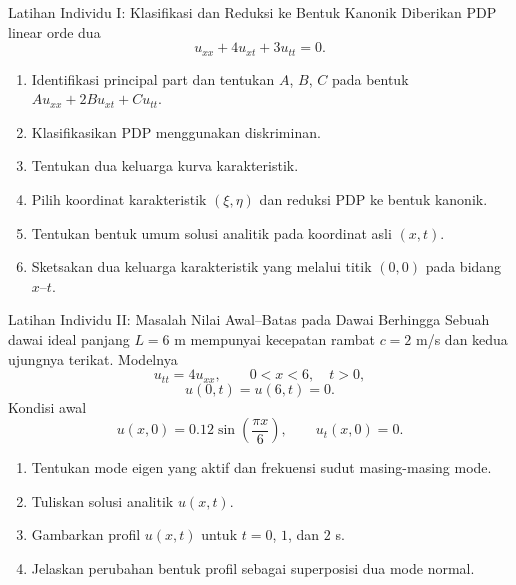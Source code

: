 \documentclass[aspectratio=169,10pt]{beamer}
\begin{document}
\begin{frame}{Latihan Individu I: Klasifikasi dan Reduksi ke Bentuk Kanonik}
\small
Diberikan PDP linear orde dua
\[
\boxed{u_{xx}+4u_{xt}+3u_{tt}=0.}
\]
\begin{enumerate}
  \item Identifikasi principal part dan tentukan $A$, $B$, $C$ pada bentuk $A u_{xx}+2B u_{xt}+C u_{tt}$.
  \item Klasifikasikan PDP menggunakan diskriminan.
  \item Tentukan dua keluarga kurva karakteristik.
  \item Pilih koordinat karakteristik $(\xi,\eta)$ dan reduksi PDP ke bentuk kanonik.
  \item Tentukan bentuk umum solusi analitik pada koordinat asli $(x,t)$.
  \item Sketsakan dua keluarga karakteristik yang melalui titik $(0,0)$ pada bidang $x$--$t$.
\end{enumerate}
\end{frame}

\begin{frame}{Latihan Individu II: Masalah Nilai Awal--Batas pada Dawai Berhingga}
\small
Sebuah dawai ideal panjang $L=6$ m mempunyai kecepatan rambat $c=2$ m/s dan kedua ujungnya terikat. Modelnya
\[
u_{tt}=4u_{xx},\qquad 0<x<6,\quad t>0,
\]
\[
u(0,t)=u(6,t)=0.
\]
Kondisi awal
\[
u(x,0)=0.12\sin\left(\frac{\pi x}{6}\right),
\qquad
u_t(x,0)=0.
\]
\begin{enumerate}
  \item Tentukan mode eigen yang aktif dan frekuensi sudut masing-masing mode.
  \item Tuliskan solusi analitik $u(x,t)$.
  \item Gambarkan profil $u(x,t)$ untuk $t=0$, $1$, dan $2$ s.
  \item Jelaskan perubahan bentuk profil sebagai superposisi dua mode normal.
\end{enumerate}
\end{frame}
\end{document}

